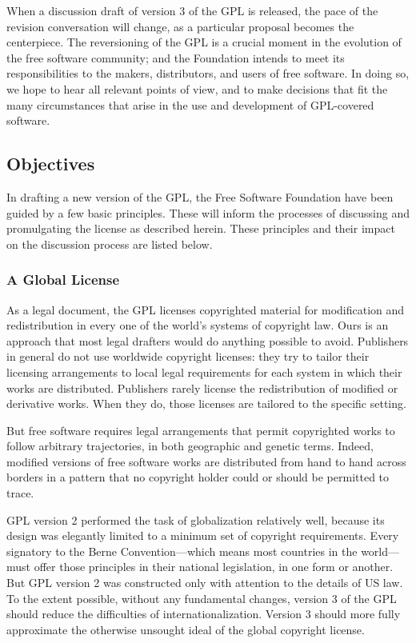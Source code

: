 \documentclass[a4paper,spanish,12pt]{book}
\begin{document}
When a discussion draft of version 3 of the GPL is released, the pace
of the revision conversation will change, as a particular proposal
becomes the centerpiece.  The reversioning of the GPL is a crucial
moment in the evolution of the free software community; and the
Foundation intends to meet its responsibilities to the makers,
distributors, and users of free software.  In doing so, we hope to
hear all relevant points of view, and to make decisions that fit the
many circumstances that arise in the use and development of
GPL-covered software.

\subsection{Objectives} In drafting a new version of the GPL, the Free
Software Foundation have been guided by a few basic principles.  These
will inform the processes of discussing and promulgating the license
as described herein.  These principles and their impact on the
discussion process are listed below.

\subsubsection{A Global License} As a legal document, the GPL licenses
copyrighted material for modification and redistribution in every one
of the world's systems of copyright law.  Ours is an approach that
most legal drafters would do anything possible to avoid.  Publishers
in general do not use worldwide copyright licenses: they try to tailor
their licensing arrangements to local legal requirements for each
system in which their works are distributed.  Publishers rarely
license the redistribution of modified or derivative works.  When they
do, those licenses are tailored to the specific setting.

But free software requires legal arrangements that permit copyrighted
works to follow arbitrary trajectories, in both geographic and genetic
terms.  Indeed, modified versions of free software works are
distributed from hand to hand across borders in a pattern that no
copyright holder could or should be permitted to trace.

GPL version 2 performed the task of globalization relatively well,
because its design was elegantly limited to a minimum set of copyright
requirements.  Every signatory to the Berne Convention---which means
most countries in the world---must offer those principles in their
national legislation, in one form or another.  But GPL version 2 was
constructed only with attention to the details of US law.  To the
extent possible, without any fundamental changes, version 3 of the GPL
should reduce the difficulties of internationalization.  Version 3
should more fully approximate the otherwise unsought ideal of the
global copyright license.
\end{document}
